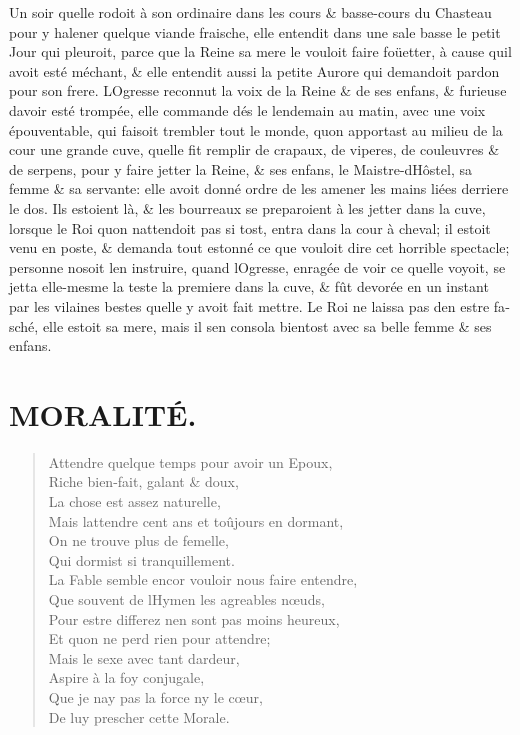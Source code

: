 \documentclass[14pt,a4paper]{memoir}
\begin{document}
\begin{otherlanguage}{french}
Un soir qu\textquotesingle elle rodoit à son ordinaire dans les cours \&
basse-cours du Chasteau pour y halener quelque viande fraische, elle
entendit dans une sale basse le petit Jour qui pleuroit, parce que la
Reine sa mere le vouloit faire foüetter, à cause qu\textquotesingle il
avoit esté méchant, \& elle entendit aussi la petite Aurore qui
demandoit pardon pour son frere. L\textquotesingle Ogresse reconnut la
voix de la Reine \& de ses enfans, \& furieuse d\textquotesingle avoir
esté trompée, elle commande dés le lendemain au matin, avec une voix
épouventable, qui faisoit trembler tout le monde, qu\textquotesingle on
apportast au milieu de la cour une grande cuve, qu\textquotesingle elle
fit remplir de crapaux, de viperes, de couleuvres \& de serpens, pour y
faire jetter la Reine, \& ses enfans, le
Maistre-d\textquotesingle Hôstel, sa femme \& sa servante: elle avoit
donné ordre de les amener les mains liées derriere le dos. Ils estoient
là, \& les bourreaux se preparoient à les jetter dans la cuve, lorsque
le Roi qu\textquotesingle on n\textquotesingle attendoit pas si tost,
entra dans la cour à cheval; il estoit venu en poste, \& demanda tout
estonné ce que vouloit dire cet horrible spectacle; personne
n\textquotesingle osoit l\textquotesingle en instruire, quand
l\textquotesingle Ogresse, enragée de voir ce quelle voyoit, se jetta
elle-mesme la teste la premiere dans la cuve, \& fût devorée en un
instant par les vilaines bestes qu\textquotesingle elle y avoit fait
mettre. Le Roi ne laissa pas d\textquotesingle en estre fasché, elle
estoit sa mere, mais il s\textquotesingle en consola bientost avec sa
belle femme \& ses enfans. \\

\section{MORALITÉ.}

\begin{verse}
  \small
Attendre quelque temps pour avoir un Epoux, \\
Riche bien-fait, galant \& doux,\\
La chose est assez naturelle, \\
Mais l\textquotesingle attendre cent ans et toûjours en dormant,  \\
 On ne trouve plus de femelle, \\
Qui dormist si tranquillement. \\
La Fable semble encor vouloir nous faire entendre, \\
Que souvent de l\textquotesingle Hymen les agreables nœuds,  \\
Pour estre differez n\textquotesingle en sont pas moins heureux,  \\
Et qu\textquotesingle on ne perd rien pour attendre; \\
Mais le sexe avec tant d\textquotesingle ardeur, \\
Aspire à la foy conjugale, \\
Que je n\textquotesingle ay pas la force ny le cœur, \\
De luy prescher cette Morale.
\end{verse}



\end{otherlanguage}
\end{document}
